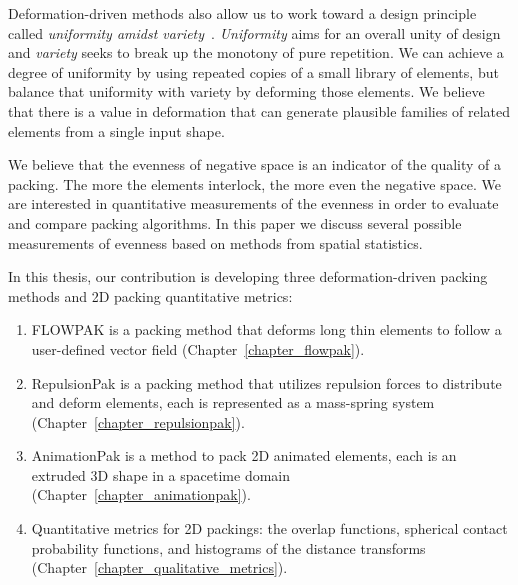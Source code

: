 \newtext
{
Deformation-driven methods also allow us to work toward a design principle called \textit{uniformity amidst variety}~\cite{Hutcheson1729, Gombrich}. 
\textit{Uniformity} aims for an overall unity of design and 
\textit{variety} seeks to break up the monotony of pure repetition.
We can achieve a degree of uniformity by using repeated copies of a small library of elements, but balance that uniformity with
variety by deforming those elements. 
We believe that there is a value in deformation that can generate plausible families of related elements from a single input shape.
}

\newtext
{
We believe that the evenness of negative space is an indicator of the quality of a packing.
The more the elements interlock, the more even the negative space. %
We are interested in quantitative measurements of the evenness 
in order to evaluate and compare packing algorithms.
In this paper we discuss several possible measurements of 
evenness based on methods from spatial statistics.
}

\newtext
{
In this thesis, our contribution is developing three deformation-driven packing methods and 2D packing quantitative metrics:
\begin{enumerate}
\item FLOWPAK is a packing method that deforms long thin elements to follow a user-defined vector field (Chapter~\ref{chapter_flowpak}).
\item RepulsionPak is a packing method that utilizes repulsion forces to distribute and deform elements,
	each is represented as a mass-spring system (Chapter~\ref{chapter_repulsionpak}).
\item AnimationPak is a method to pack 2D animated elements, each is an extruded 3D shape
	in a spacetime domain (Chapter~\ref{chapter_animationpak}). 
\item  Quantitative metrics for 2D packings: the overlap functions, spherical contact probability functions,
and histograms of the distance transforms (Chapter~\ref{chapter_qualitative_metrics}). 
\end{enumerate}
}




